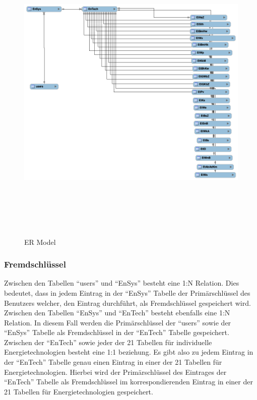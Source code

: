 \begin{figure}[h]
	\centering
	\includegraphics[height=15cm,width=18cm]{images/eer}
	\caption{ER Model}
	\label{fig:ERModel}
\end{figure}
\newpage
\subsubsection{Fremdschlüssel}
 Zwischen den Tabellen “users” und “EnSys” besteht eine 1:N Relation. Dies bedeutet, dass in jedem Eintrag in der “EnSys” Tabelle der Primärschlüssel des Benutzers welcher, den Eintrag durchführt, als Fremdschlüssel gespeichert wird. Zwischen den Tabellen “EnSys” und “EnTech” besteht ebenfalls eine 1:N Relation. In diesem Fall werden die Primärschlüssel der “users” sowie der “EnSys” Tabelle als Fremdschlüssel in der “EnTech” Tabelle gespeichert. Zwischen der “EnTech” sowie jeder der 21 Tabellen für individuelle Energietechnologien besteht eine 1:1 beziehung. Es gibt also zu jedem Eintrag in der “EnTech” Tabelle genau einen Eintrag in einer der 21 Tabellen für Energietechnologien. Hierbei wird der Primärschlüssel des Eintrages der “EnTech” Tabelle als Fremdschlüssel im korrespondierenden Eintrag in einer der 21 Tabellen für Energietechnologien gespeichert.



